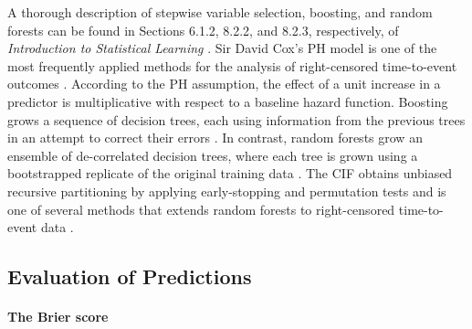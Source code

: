 \documentclass{article}
\begin{document}
A thorough description of stepwise variable selection, boosting, and
random forests can be found in Sections 6.1.2, 8.2.2, and 8.2.3,
respectively, of \emph{Introduction to Statistical Learning}
\cite{james2013introduction}. Sir David Cox's PH model is one of the
most frequently applied methods for the analysis of right-censored
time-to-event outcomes \cite{kleinbaum2010survival}. According to the PH
assumption, the effect of a unit increase in a predictor is
multiplicative with respect to a baseline hazard function. Boosting
grows a sequence of decision trees, each using information from the
previous trees in an attempt to correct their errors
\cite{friedman2001greedy, chen2016xgboost}. In contrast, random forests
grow an ensemble of de-correlated decision trees, where each tree is
grown using a bootstrapped replicate of the original training data
\cite{Breiman2001}. The CIF obtains unbiased recursive partitioning by
applying early-stopping and permutation tests and is one of several
methods that extends random forests to right-censored time-to-event data
\cite{hothorn2006survival, strobl2007bias, strobl2008conditional, ishwaran2008random, jaeger2019oblique}.

\hypertarget{evaluation-of-predictions}{%
\subsection{Evaluation of Predictions}\label{evaluation-of-predictions}}

\label{subsec:evaluation}

\paragraph{The Brier score}
\end{document}

